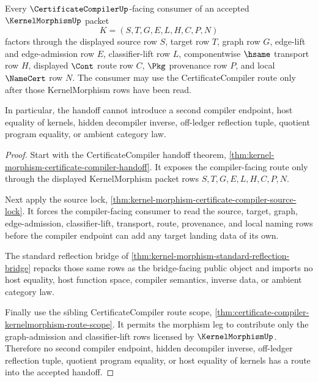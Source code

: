 \begin{theorem}
\label{thm:kernel-morphism-certificatecompiler-route-nonescape}
Every $\CertificateCompilerUp$-facing consumer of an accepted
$\KernelMorphismUp$ packet
$$
K=(S,T,G,E,L,H,C,P,N)
$$
factors through the displayed source row $S$, target row $T$, graph row $G$,
edge-lift and edge-admission row $E$, classifier-lift row $L$, componentwise
$\hsame$ transport row $H$, displayed $\Cont$ route row $C$, $\Pkg$
provenance row $P$, and local $\NameCert$ row $N$. The consumer may use the
CertificateCompiler route only after those KernelMorphism rows have been
read.

In particular, the handoff cannot introduce a second compiler endpoint, host
equality of kernels, hidden decompiler inverse, off-ledger reflection tuple,
quotient program equality, or ambient category law.
\end{theorem}
\begin{proof}
Start with the CertificateCompiler handoff theorem,
\autoref{thm:kernel-morphism-certificate-compiler-handoff}. It exposes the
compiler-facing route only through the displayed KernelMorphism packet rows
$S,T,G,E,L,H,C,P,N$.

Next apply the source lock,
\autoref{thm:kernel-morphism-certificate-compiler-source-lock}. It forces the
compiler-facing consumer to read the source, target, graph, edge-admission,
classifier-lift, transport, route, provenance, and local naming rows before
the compiler endpoint can add any target landing data of its own.

The standard reflection bridge of
\autoref{thm:kernel-morphism-standard-reflection-bridge} repacks those same
rows as the bridge-facing public object and imports no host equality, host
function space, compiler semantics, inverse data, or ambient category law.

Finally use the sibling CertificateCompiler route scope,
\autoref{thm:certificate-compiler-kernelmorphism-route-scope}. It permits the
morphism leg to contribute only the graph-admission and classifier-lift rows
licensed by $\KernelMorphismUp$. Therefore no second compiler endpoint,
hidden decompiler inverse, off-ledger reflection tuple, quotient program
equality, or host equality of kernels has a route into the accepted handoff.
\end{proof}


